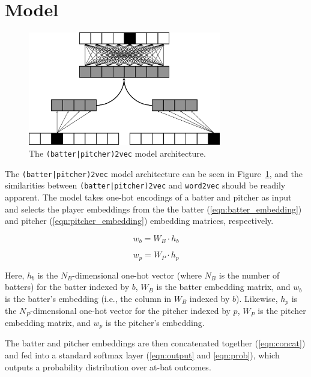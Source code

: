 \documentclass{article}
\begin{document}
\section{Model}
\label{model}

\begin{figure}
\centering
\includegraphics[width=0.75\textwidth,height=\textheight,keepaspectratio]{batter_pitcher_model.png}
\caption{The \texttt{(batter|pitcher)2vec} model architecture.}
\label{fig:batter_pitcher}
\end{figure}

The \texttt{(batter|pitcher)2vec} model architecture can be seen in Figure~\ref{fig:batter_pitcher}, and the similarities between \texttt{(batter|pitcher)2vec} and \texttt{word2vec} should be readily apparent. The model takes one-hot encodings of a batter and pitcher as input and selects the player embeddings from the the batter (\ref{eqn:batter_embedding}) and pitcher (\ref{eqn:pitcher_embedding}) embedding matrices, respectively.

\begin{equation}
\label{eqn:batter_embedding}
w_b = W_B \cdot h_b
\end{equation}

\begin{equation}
\label{eqn:pitcher_embedding}
w_p = W_P \cdot h_p
\end{equation}

Here, $h_b$ is the $N_B$-dimensional one-hot vector (where $N_B$ is the number of batters) for the batter indexed by $b$, $W_B$ is the batter embedding matrix, and $w_b$ is the batter's embedding (i.e., the column in $W_B$ indexed by $b$). Likewise, $h_p$ is the $N_P$-dimensional one-hot vector for the pitcher indexed by $p$, $W_P$ is the pitcher embedding matrix, and $w_p$ is the pitcher's embedding.

The batter and pitcher embeddings are then concatenated together (\ref{eqn:concat}) and fed into a standard softmax layer (\ref{eqn:output} and \ref{eqn:prob}), which outputs a probability distribution over at-bat outcomes.
\end{document}
